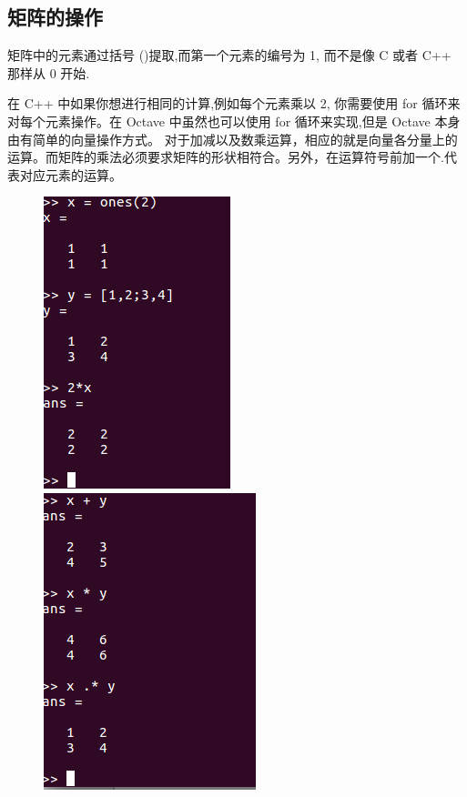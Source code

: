 \documentclass[a4paper,11pt]{ctexart}
\begin{document}
\subsection{矩阵的操作}
矩阵中的元素通过括号 ()提取,而第一个元素的编号为 1, 而不是像 C 或者 C++ 那样从 0 开始.\par
在 C++ 中如果你想进行相同的计算,例如每个元素乘以 2, 你需要使用 for 循环来对每个元素操作。在 Octave 中虽然也可以使用 for 循环来实现,但是 Octave 本身由有简单的向量操作方式。
对于加减以及数乘运算，相应的就是向量各分量上的运算。而矩阵的乘法必须要求矩阵的形状相符合。另外，在运算符号前加一个.代表对应元素的运算。
\begin{figure}[H]
\begin{minipage}[t]{0.5\linewidth}
\centering
\includegraphics[width=.5\textwidth]{vector1.png}
\end{minipage}%
\begin{minipage}[t]{0.5\linewidth}
\centering
\includegraphics[width=.5\textwidth]{vector2.png}
\end{minipage}
\end{figure}
\end{document}
